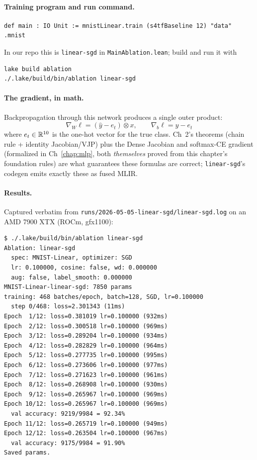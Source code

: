 \paragraph{Training program and run command.}
\begin{verbatim}
def main : IO Unit := mnistLinear.train (s4tfBaseline 12) "data" .mnist
\end{verbatim}

In our repo this is \texttt{linear-sgd} in
\texttt{MainAblation.lean}; build and run it with
\begin{verbatim}
lake build ablation
./.lake/build/bin/ablation linear-sgd
\end{verbatim}

\paragraph{The gradient, in math.}
Backpropagation through this network produces a single outer
product:
\[
  \nabla_W \ell = (\hat{y} - e_t) \otimes x, \qquad
  \nabla_b \ell = \hat{y} - e_t
\]
where \(e_t \in \mathbb{R}^{10}\) is the one-hot vector for the true
class. Ch~2's theorems (chain rule + identity Jacobian/VJP) plus
the Dense Jacobian and softmax-CE gradient (formalized in
Ch~\ref{chap:mlp}, both \emph{themselves} proved from this
chapter's foundation rules) are what guarantees these formulas
are correct; \texttt{linear-sgd}'s codegen emits exactly these as
fused MLIR.

\paragraph{Results.}
Captured verbatim from \texttt{runs/2026-05-05-linear-sgd/linear-sgd.log}
on an AMD 7900 XTX (ROCm, gfx1100):

\begin{verbatim}
$ ./.lake/build/bin/ablation linear-sgd
Ablation: linear-sgd
  spec: MNIST-Linear, optimizer: SGD
  lr: 0.100000, cosine: false, wd: 0.000000
  aug: false, label_smooth: 0.000000
MNIST-Linear-linear-sgd: 7850 params
training: 468 batches/epoch, batch=128, SGD, lr=0.100000
  step 0/468: loss=2.301343 (11ms)
Epoch  1/12: loss=0.381019 lr=0.100000 (932ms)
Epoch  2/12: loss=0.300518 lr=0.100000 (969ms)
Epoch  3/12: loss=0.289204 lr=0.100000 (934ms)
Epoch  4/12: loss=0.282829 lr=0.100000 (964ms)
Epoch  5/12: loss=0.277735 lr=0.100000 (995ms)
Epoch  6/12: loss=0.273606 lr=0.100000 (977ms)
Epoch  7/12: loss=0.271623 lr=0.100000 (961ms)
Epoch  8/12: loss=0.268908 lr=0.100000 (930ms)
Epoch  9/12: loss=0.265967 lr=0.100000 (969ms)
Epoch 10/12: loss=0.265967 lr=0.100000 (969ms)
  val accuracy: 9219/9984 = 92.34%
Epoch 11/12: loss=0.265719 lr=0.100000 (949ms)
Epoch 12/12: loss=0.263504 lr=0.100000 (967ms)
  val accuracy: 9175/9984 = 91.90%
Saved params.
\end{verbatim}

